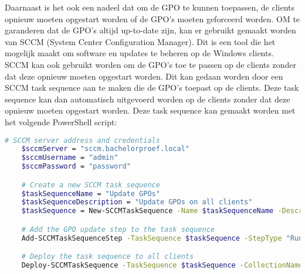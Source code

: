 Daarnaast is het ook een nadeel dat om de GPO te kunnen toepassen, de clients opnieuw moeten opgestart worden of de GPO's moeten geforceerd worden. OM te garanderen dat de GPO's altijd up-to-date zijn, kan er gebruikt gemaakt worden van SCCM (System Center Configuration Manager). Dit is een tool die het mogelijk maakt om software en updates te beheren op de Windows clients. 
SCCM kan ook gebruikt worden om de GPO's toe te passen op de clients zonder dat deze opnieuw moeten opgestart worden. Dit kan gedaan worden door een SCCM task sequence aan te maken die de GPO's toepast op de clients. Deze task sequence kan dan automatisch uitgevoerd worden op de clients zonder dat deze opnieuw moeten opgestart worden.
Deze task sequence kan gemaakt worden met het volgende PowerShell script:
\begin{lstlisting}[language=bash]
    # SCCM server address and credentials
    $sccmServer = "sccm.bachelorproef.local"
    $sccmUsername = "admin"
    $sccmPassword = "password"

    # Create a new SCCM task sequence
    $taskSequenceName = "Update GPOs"
    $taskSequenceDescription = "Update GPOs on all clients"
    $taskSequence = New-SCCMTaskSequence -Name $taskSequenceName -Description $taskSequenceDescription -Server $sccmServer -Username $sccmUsername -Password $sccmPassword

    # Add the GPO update step to the task sequence
    Add-SCCMTaskSequenceStep -TaskSequence $taskSequence -StepType "Run Command" -Command "gpupdate /force" -Server $sccmServer -Username $sccmUsername -Password $sccmPassword

    # Deploy the task sequence to all clients
    Deploy-SCCMTaskSequence -TaskSequence $taskSequence -CollectionName "All Systems" -Server $sccmServer -Username $sccmUsername -Password $sccmPassword
\end{lstlisting}
